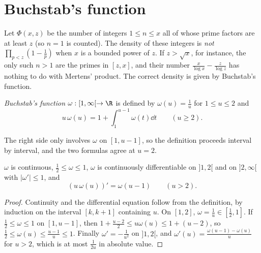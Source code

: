 \section{Buchstab's function}

Let $\Phi(x,z)$ be the number of integers $1\le n\le x$ all of whose prime factors are at least $z$ (so $n=1$ is counted). The density of these integers is \emph{not} $\prod_{p<z}(1-\frac1p)$ when $x$ is a bounded power of $z$. If $z>\sqrt x$, for instance, the only such $n>1$ are the primes in $[z,x]$, and their number $\frac x{\log x}-\frac z{\log z}$ has nothing to do with Mertens' product. The correct density is given by Buchstab's function.

\begin{definition}\label{def:buchstab}
\emph{Buchstab's function} $\omega:[1,\infty[\to\R$ is defined by $\omega(u)=\frac1u$ for $1\le u\le2$ and
\[
u\,\omega(u)=1+\int_1^{u-1}\omega(t)\dd t\qquad(u\ge2).
\]
\end{definition}

The right side only involves $\omega$ on $[1,u-1]$, so the definition proceeds interval by interval, and the two formulas agree at $u=2$.

\begin{lemma}\label{lem:buchstabprops}
$\omega$ is continuous, $\frac12\le\omega\le1$, $\omega$ is continuously differentiable on $]1,2[$ and on $]2,\infty[$ with $|\omega'|\le1$, and
\[
(u\,\omega(u))'=\omega(u-1)\qquad(u>2).
\]
\end{lemma}
\begin{proof}
Continuity and the differential equation follow from the definition, by induction on the interval $[k,k+1]$ containing $u$. On $[1,2]$, $\omega=\frac1u\in[\frac12,1]$. If $\frac12\le\omega\le1$ on $[1,u-1]$, then $1+\frac{u-2}2\le u\omega(u)\le1+(u-2)$, so $\frac12\le\omega(u)\le\frac{u-1}u\le1$. Finally $\omega'=-\frac1{u^2}$ on $]1,2[$, and $\omega'(u)=\frac{\omega(u-1)-\omega(u)}u$ for $u>2$, which is at most $\frac1{2u}$ in absolute value.
\end{proof}

